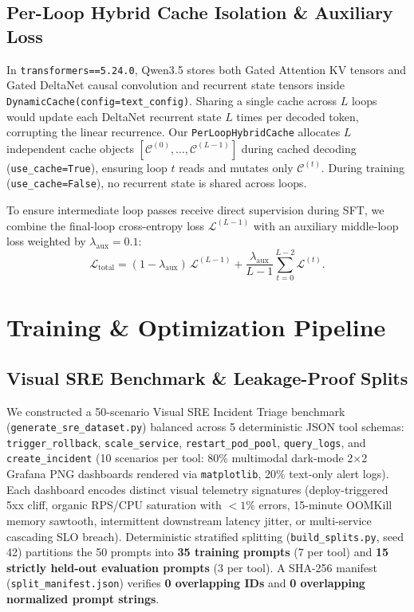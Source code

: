 \documentclass[10pt,letterpaper]{article}
\begin{document}
\subsection{Per-Loop Hybrid Cache Isolation \& Auxiliary Loss}
In \texttt{transformers==5.24.0}, Qwen3.5 stores both Gated Attention KV tensors and Gated DeltaNet causal convolution and recurrent state tensors inside \texttt{DynamicCache(config=text\_config)}. Sharing a single cache across $L$ loops would update each DeltaNet recurrent state $L$ times per decoded token, corrupting the linear recurrence. Our \texttt{PerLoopHybridCache} allocates $L$ independent cache objects $[\mathcal{C}^{(0)}, \dots, \mathcal{C}^{(L-1)}]$ during cached decoding (\texttt{use\_cache=True}), ensuring loop $t$ reads and mutates only $\mathcal{C}^{(t)}$. During training (\texttt{use\_cache=False}), no recurrent state is shared across loops.

To ensure intermediate loop passes receive direct supervision during SFT, we combine the final-loop cross-entropy loss $\mathcal{L}^{(L-1)}$ with an auxiliary middle-loop loss weighted by $\lambda_{\text{aux}} = 0.1$:
\begin{equation}
    \mathcal{L}_{\text{total}} = (1 - \lambda_{\text{aux}})\,\mathcal{L}^{(L-1)} + \frac{\lambda_{\text{aux}}}{L - 1} \sum_{t=0}^{L-2} \mathcal{L}^{(t)}.
    \label{eq:aux_loss}
\end{equation}

\section{Training \& Optimization Pipeline}
\subsection{Visual SRE Benchmark \& Leakage-Proof Splits}
We constructed a 50-scenario Visual SRE Incident Triage benchmark (\texttt{generate\_sre\_dataset.py}) balanced across 5 deterministic JSON tool schemas: \texttt{trigger\_rollback}, \texttt{scale\_service}, \texttt{restart\_pod\_pool}, \texttt{query\_logs}, and \texttt{create\_incident} (10 scenarios per tool: 80\% multimodal dark-mode 2$\times$2 Grafana PNG dashboards rendered via \texttt{matplotlib}, 20\% text-only alert logs). Each dashboard encodes distinct visual telemetry signatures (deploy-triggered 5xx cliff, organic RPS/CPU saturation with $<1\%$ errors, 15-minute OOMKill memory sawtooth, intermittent downstream latency jitter, or multi-service cascading SLO breach). Deterministic stratified splitting (\texttt{build\_splits.py}, seed 42) partitions the 50 prompts into \textbf{35 training prompts} (7 per tool) and \textbf{15 strictly held-out evaluation prompts} (3 per tool). A SHA-256 manifest (\texttt{split\_manifest.json}) verifies \textbf{0 overlapping IDs} and \textbf{0 overlapping normalized prompt strings}.
\end{document}
